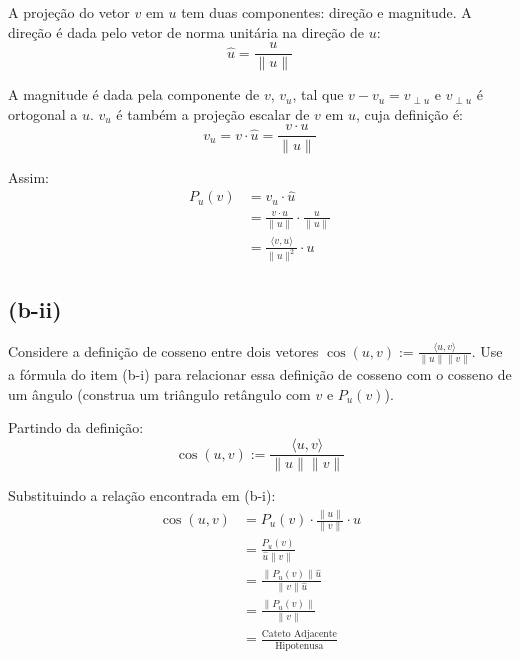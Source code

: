 \vspace{0.5em}
\noindent A projeção do vetor $v$ em $u$ tem duas componentes: direção e magnitude. A direção é dada pelo vetor de norma unitária na direção de $u$:
\begin{equation*}
    \hat{u} = \frac{u}{\|u\|}
\end{equation*}

\noindent A magnitude é dada pela componente de $v$, $v_u$, tal que $v - v_u = v_{\perp u}$ e $v_{\perp u}$ é ortogonal a $u$. $v_u$ é também a projeção escalar de $v$ em $u$, cuja definição é:
\begin{equation*}
    v_u = v \cdot \hat{u} = \frac{v \cdot u}{\|u\|}
\end{equation*}

\noindent Assim:
\begin{align*}
    P_u(v) & = v_u \cdot \hat{u}                             \\
           & = \frac{v \cdot u}{\|u\|} \cdot \frac{u}{\|u\|} \\
           & = \frac{\langle v, u \rangle}{\|u\|^2} \cdot u
\end{align*}

\subsection*{(b-ii)}
Considere a definição de cosseno entre dois vetores $\cos(u, v) := \frac{\langle u, v \rangle}{\|u\|\|v\|}$. Use a fórmula do item (b-i) para relacionar essa definição de cosseno com o cosseno de um ângulo (construa um triângulo retângulo com $v$ e $P_u(v)$).

\vspace{0.5em}
\noindent Partindo da definição:
\begin{equation*}
    \cos(u, v) := \frac{\langle u, v \rangle}{\|u\|\|v\|}
\end{equation*}

\noindent Substituindo a relação encontrada em (b-i):
\begin{align*}
    \cos(u, v) & = P_u(v) \cdot \frac{\|u\|}{\|v\|} \cdot u          \\
               & = \frac{P_u(v)}{\hat{u}\|v\|}                       \\
               & = \frac{\|P_u(v)\|\hat{u}}{\|v\|\hat{u}}            \\
               & = \frac{\|P_u(v)\|}{\|v\|}                          \\
               & = \frac{\text{Cateto Adjacente}}{\text{Hipotenusa}}
\end{align*}

